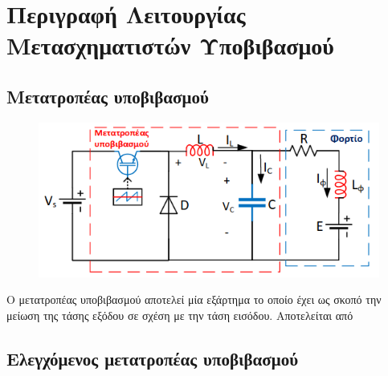 \section{Περιγραφή Λειτουργίας Μετασχηματιστών Υποβιβασμού}

\subsection{Μετατροπέας υποβιβασμού}

\begin{figure}[h]
	\centering
	\includegraphics{Images/transducer}
\end{figure}

Ο μετατροπέας υποβιβασμού αποτελεί μία εξάρτημα το οποίο έχει ως σκοπό την μείωση της τάσης εξόδου σε σχέση με την τάση εισόδου. Αποτελείται από 


\subsection{Ελεγχόμενος μετατροπέας υποβιβασμού}